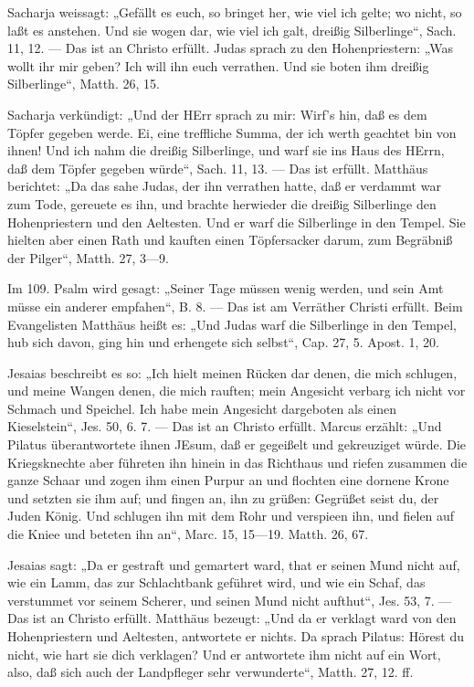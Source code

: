  Sacharja weissagt: „Gefällt es euch, so bringet her, wie viel ich gelte; wo nicht, so laßt es anstehen. Und sie wogen dar, wie viel ich galt, dreißig Silberlinge“, Sach. 11, 12. — Das ist an Christo erfüllt. Judas sprach zu den Hohenpriestern: „Was wollt ihr mir geben? Ich will ihn euch verrathen. Und sie boten ihm dreißig Silberlinge“, Matth. 26, 15.

 Sacharja verkündigt: „Und der HErr sprach zu mir: Wirf’s hin, daß es dem Töpfer gegeben werde. Ei, eine treffliche Summa, der ich werth geachtet bin von ihnen! Und ich nahm die dreißig Silberlinge, und warf sie ins Haus des HErrn, daß dem Töpfer gegeben würde“, Sach. 11, 13. — Das ist erfüllt. Matthäus berichtet: „Da das sahe Judas, der ihn verrathen hatte, daß er verdammt war zum Tode, gereuete es ihn, und brachte herwieder die dreißig Silberlinge den Hohenpriestern und den Aeltesten. Und er warf die Silberlinge in den Tempel. Sie hielten aber einen Rath und kauften einen Töpfersacker darum, zum Begräbniß der Pilger“, Matth. 27, 3—9.

 Im 109. Psalm wird gesagt: „Seiner Tage müssen wenig werden, und sein Amt müsse ein anderer empfahen“, B. 8. — Das ist am Verräther Christi erfüllt. Beim Evangelisten Matthäus heißt es: „Und Judas warf die Silberlinge in den Tempel, hub sich davon, ging hin und erhengete sich selbst“, Cap. 27, 5. Apost. 1, 20.

 Jesaias beschreibt es so: „Ich hielt meinen Rücken dar denen, die mich schlugen, und meine Wangen denen, die mich rauften; mein Angesicht verbarg ich nicht vor Schmach und Speichel. Ich habe mein Angesicht dargeboten als einen Kieselstein“, Jes. 50, 6. 7. — Das ist an Christo erfüllt. Marcus erzählt: „Und Pilatus überantwortete ihnen JEsum, daß er gegeißelt und gekreuziget würde. Die Kriegsknechte aber führeten ihn hinein in das Richthaus und riefen zusammen die ganze Schaar und zogen ihm einen Purpur an und flochten eine dornene Krone und setzten sie ihm auf; und fingen an, ihn zu grüßen: Gegrüßet seist du, der Juden König. Und schlugen ihn mit dem Rohr und verspieen ihn, und fielen auf die Kniee und beteten ihn an“, Marc. 15, 15—19. Matth. 26, 67.

 Jesaias sagt: „Da er gestraft und gemartert ward, that er seinen Mund nicht auf, wie ein Lamm, das zur Schlachtbank geführet wird, und wie ein Schaf, das verstummet vor seinem Scherer, und seinen Mund nicht aufthut“, Jes. 53, 7. — Das ist an Christo erfüllt. Matthäus bezeugt: „Und da er verklagt ward von den Hohenpriestern und Aeltesten, antwortete er nichts. Da sprach Pilatus: Hörest du nicht, wie hart sie dich verklagen? Und er antwortete ihm nicht auf ein Wort, also, daß sich auch der Landpfleger sehr verwunderte“, Matth. 27, 12. ff.

